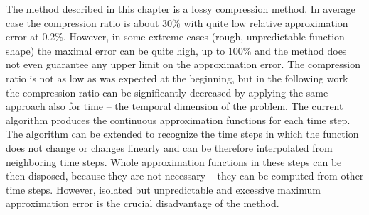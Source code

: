 The method described in this chapter is a lossy compression method. In average case the compression ratio is about 30\% with quite low relative approximation error at 0.2\%. However, in some extreme cases (rough, unpredictable function shape) the maximal error can be quite high, up to 100\% and the method does not even guarantee any upper limit on the approximation error. The compression ratio is not as low as was expected at the beginning, but in the following work the compression ratio can be significantly decreased by applying the same approach also for time -- the temporal dimension of the problem. The current algorithm produces the continuous approximation functions for each time step. The algorithm can be extended to recognize the time steps in which the function does not change or changes linearly and can be therefore interpolated from neighboring time steps. Whole approximation functions in these steps can be then disposed, because they are not necessary -- they can be computed from other time steps. However, isolated but unpredictable and excessive maximum approximation error is the crucial disadvantage of the method.
